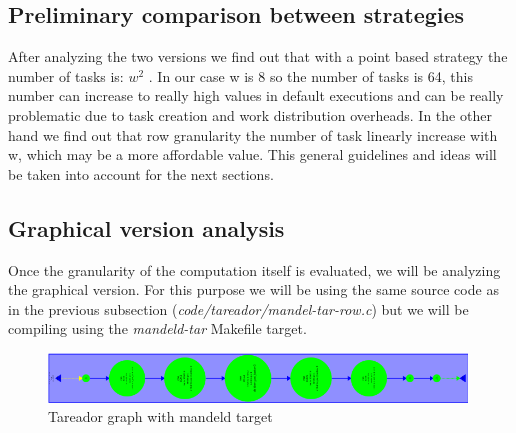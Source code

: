 \documentclass{article}
\begin{document}
\subsection{Preliminary comparison between strategies}
\begin{flushleft}
After analyzing the two versions we find out that with a point based strategy the number of tasks is: $w^2$ . In our case w is 8 so the number of tasks is 64, this number can increase to really high values in default executions and can be really problematic due to task creation and work distribution overheads. In the other hand we find out that row granularity the number of task linearly increase with w, which may be a more affordable value. This general guidelines and ideas will be taken into account for the next sections.
\end{flushleft}
\subsection{Graphical version analysis}
\begin{flushleft}
Once the granularity of the computation itself is evaluated, we will be analyzing the graphical version. For this purpose we will be using the same source code as in the previous subsection (\textit{code/tareador/mandel-tar-row.c}) but we will be compiling using the \textit{mandeld-tar} Makefile target. 
\end{flushleft}

\begin{figure}[ht]
    \centering
    \includegraphics[width=0.99\textwidth]{r-mandeld.png}
    \caption{Tareador graph with mandeld target}
    \label{fig:tareadormandeld}
\end{figure}
\end{document}
